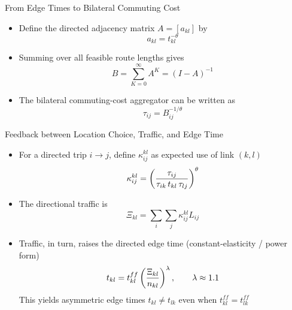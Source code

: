 \documentclass[11pt,aspectratio=169]{beamer}
\newcommand{\good}[1]{\textcolor{blue!70!black}{#1}}
\begin{document}
\begin{frame}{From Edge Times to Bilateral Commuting Cost}
\begin{itemize}
  \item Define the directed adjacency matrix $A=[a_{kl}]$ by
  \vspace{-0.5em}\begin{equation}
    a_{kl} = t_{kl}^{-\theta}
  \end{equation}
  \item Summing over all feasible route lengths gives
  \vspace{-0.5em}\begin{equation}
    B = \sum_{K=0}^{\infty}A^K = (I-A)^{-1}
  \end{equation}
  \item The bilateral commuting-cost aggregator can be written as
  \vspace{-0.5em}\begin{equation}\label{eq:inverse}
    \tau_{ij} = B_{ij}^{-1/\theta}
  \end{equation}
\end{itemize}
\end{frame}

\begin{frame}{Feedback between Location Choice, Traffic, and Edge Time}
\begin{itemize}
  \item For a directed trip $i\to j$, define $\kappa^{kl}_{ij}$ as expected use of link $(k,l)$
  \vspace{-1em}\begin{equation}
    \kappa^{kl}_{ij} = \left( \frac{\tau_{ij}} {\tau_{ik}\,t_{kl}\,\tau_{lj}} \right)^\theta
  \vspace{-0.5em}\end{equation}
  \item The directional traffic is
  \begin{equation}\label{eq:Xi_c}
  \Xi_{kl} = \sum_i\sum_j \kappa^{kl}_{ij}L_{ij}
  \end{equation}
  \item Traffic, in turn, raises the directed edge time (\good{constant-elasticity / power form})
  \vspace{-0.5em}\begin{equation}\label{eq:c_Xi}
    t_{kl} = t_{kl}^{ff} \left(\frac{\Xi_{kl}}{n_{kl}}\right)^{\lambda},\qquad \lambda\approx 1.1
  \vspace{-0.5em}\end{equation}
    This yields asymmetric edge times $t_{kl}\neq t_{lk}$ even when $t_{kl}^{ff}=t_{lk}^{ff}$
  \end{itemize}
\end{frame}
\end{document}
